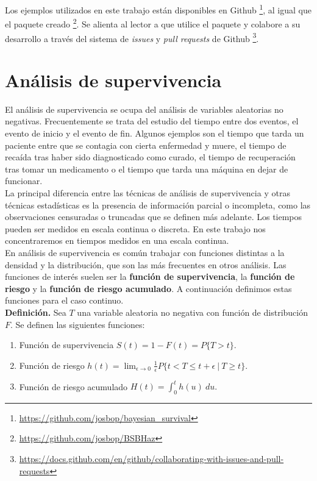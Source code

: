 \documentclass[11pt,a4paper]{article}
\begin{document}
Los ejemplos utilizados en este trabajo están disponibles en Github \footnote{\url{https://github.com/josbop/bayesian_survival}}, al igual que el paquete creado \footnote{\url{https://github.com/josbop/BSBHaz}}. Se alienta al lector a que utilice el paquete y colabore a su desarrollo a través del sistema de \textit{issues} y \textit{pull requests} de Github \footnote{\url{https://docs.github.com/en/github/collaborating-with-issues-and-pull-requests}}.\\

\newpage

\section{Análisis de supervivencia} \label{analisis_sup}

El análisis de supervivencia se ocupa del análisis de variables aleatorias no negativas. Frecuentemente se trata del estudio del tiempo entre dos eventos, el evento de inicio y el evento de fin. Algunos ejemplos son el tiempo que tarda un paciente entre que se contagia con cierta enfermedad y muere, el tiempo de recaída tras haber sido diagnosticado como curado, el tiempo de recuperación tras tomar un medicamento o el tiempo que tarda una máquina en dejar de funcionar.\\

La principal diferencia entre las técnicas de análisis de supervivencia y otras técnicas estadísticas es la presencia de información parcial o incompleta, como las observaciones censuradas o truncadas que se definen más adelante. Los tiempos pueden ser medidos en escala continua o discreta. En este trabajo nos concentraremos en tiempos medidos en una escala continua.\\

En análisis de supervivencia es común trabajar con funciones distintas a la densidad y la distribución, que son las más frecuentes en otros análisis. Las funciones de interés suelen ser la \textbf{función de supervivencia}, la \textbf{función de riesgo} y la \textbf{función de riesgo acumulado}. A continuación definimos estas funciones para el caso continuo.\\

\textbf{Definición.} Sea $T$ una variable aleatoria no negativa con función de distribución $F$. Se definen las siguientes funciones:
\begin{enumerate}
\item Función de supervivencia $S(t) = 1-F(t) = P\lbrace T > t \rbrace$.
\item Función de riesgo $h(t) = \lim_{\epsilon \to 0} \frac{1}{\epsilon}P\lbrace t<T\leq t+\epsilon \ | \ T \geq t \rbrace.$
\item Función de riesgo acumulado $H(t) = \int_0^t h(u) \ du.$\\
\end{enumerate}
\end{document}
